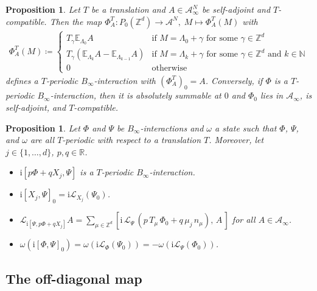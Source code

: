 \documentclass[a4paper]{article}
\newcommand{\E}{\mathbb{E}}
\renewcommand{\i}{\mathrm{i}}
\renewcommand{\Phi}{\varPhi}
\renewcommand{\Psi}{\varPsi}
\newcommand{\g}{\gamma}
\newcommand{\La}{\Lambda}
\newcommand{\w}{\omega}
\newcommand{\N}{\mathbb{N}}
\newcommand{\Z}{\mathbb{Z}}
\newcommand{\mA}{\mathcal{A}}
\newcommand{\R}{\mathbb{R}}
\newcommand{\mL}{\mathcal{L}}
\theoremstyle{plain}
\newtheorem{proposition}[theorem]{Proposition}
\theoremstyle{definition}
\theoremstyle{remark}
\renewcommand{\(}{\left(}
\renewcommand{\)}{\right)}
\begin{document}
\begin{proposition}\label{prop: interaction associated to observable}
    Let $T$ be a translation and $A\in \mA_\infty^N$ be self-adjoint and $T$-compatible. Then the map $\Phi_{A}^T\colon P_0(\Z^d) \to \mA^N  ,\; M\mapsto \Phi_{A}^T(M)$ with
    \begin{align*}
        \Phi_{A}^T(M)\coloneq
        \left\{\begin{array}{cl}
        T_{\g}\E_{\La_{0}}A & \mbox{if  $M=\La_0 +\g$ for some $\g\in\Z^d$}\\
        T_{\g}(\E_{\La_{k}}A - \E_{\La_{k-1}}A)&
        \mbox{if  $M=\La_k +\g$ for some $\g\in\Z^d$ and $k\in\N$}\\
        0 & \mbox{otherwise}
        \end{array}
        \right
        .
    \end{align*}
   defines a  $T$-periodic $B_\infty$-interaction with $(\Phi_A^T)_0 = A$. Conversely, if $\Phi$ is a $T$-periodic $B_\infty$-interaction, then it is absolutely summable at $0$ and $\Phi_0$ lies in $\mA_\infty$, is self-adjoint, and $T$-compatible.
\end{proposition}

\medskip

\begin{proposition}\label{commutator of interactions}
    Let $\Phi$ and $\Psi$ be $B_\infty$-interactions and $\omega$ a state such that $\Phi$, $\Psi$, and $\w$ are all  $T$-periodic with respect to a translation $T$. Moreover, let $j \in \{1,\dots,d\}$, $p,q \in \R$.
    \begin{itemize}
        \item[\rm(i)] $\i[p\Phi + qX_j, \Psi]$ is a $T$-periodic $B_\infty$-interaction.
        \item[\rm(ii)] $\i[X_j,\Psi]_0  = \i\mathcal{L}_{X_j}(\Psi_0)$.
        \item[\rm(iii)] $\mL_{\i[\Psi,p\Phi+qX_j]}A = \sum_{\mu \in \Z^d} [\i \, \mL_\Psi \, (p\, T_\mu\, \Phi_0 + q \, \mu_j \,  n_\mu) ,\, A\, ]$ for all $A\in \mA_\infty$.
        \item[\rm(iv)] $\omega(\i[\Phi,\Psi]_0)  =\omega(\i\mathcal{L}_\Phi(\Psi_0)) =-\omega(\i\mathcal{L}_\Psi(\Phi_0))$.
    \end{itemize}
\end{proposition}


\subsection{The off-diagonal map}\label{sec:offdiag}
\end{document}
